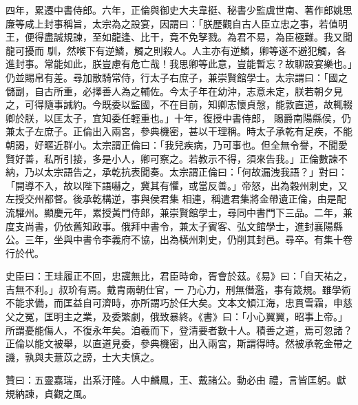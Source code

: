 \begin{pinyinscope}
 四年，累遷中書侍郎。六年，正倫與御史大夫韋挺、秘書少監虞世南、著作郎姚思廉等咸上封事稱旨，太宗為之設宴，因謂曰：「朕歷觀自古人臣立忠之事，若值明王，便得盡誠規諫，至如龍逢、比干，竟不免孥戮。為君不易，為臣極難。我又聞龍可擾而
 馴，然喉下有逆鱗，觸之則殺人。人主亦有逆鱗，卿等遂不避犯觸，各進封事。常能如此，朕豈慮有危亡哉！我思卿等此意，豈能暫忘？故聊設宴樂也。」仍並賜帛有差。尋加散騎常侍，行太子右庶子，兼崇賢館學士。太宗謂曰：「國之儲副，自古所重，必擇善人為之輔佐。今太子年在幼沖，志意未定，朕若朝夕見之，可得隨事誡約。今既委以監國，不在目前，知卿志懷貞愨，能敦直道，故輒輟卿於朕，以匡太子，宜知委任輕重也。」十年，復授中書侍郎，
 賜爵南陽縣侯，仍兼太子左庶子。正倫出入兩宮，參典機密，甚以干理稱。時太子承乾有足疾，不能朝謁，好暱近群小。太宗謂正倫曰：「我兒疾病，乃可事也。但全無令譽，不聞愛賢好善，私所引接，多是小人，卿可察之。若教示不得，須來告我。」正倫數諫不納，乃以太宗語告之，承乾抗表聞奏。太宗謂正倫曰：「何故漏洩我語？」對曰：「開導不入，故以陛下語嚇之，冀其有懼，或當反善。」帝怒，出為穀州刺史，又左授交州都督。後承乾構逆，事與侯君集
 相連，稱遣君集將金帶遺正倫，由是配流驩州。顯慶元年，累授黃門侍郎，兼崇賢館學士，尋同中書門下三品。二年，兼度支尚書，仍依舊知政事。俄拜中書令，兼太子賓客、弘文館學士，進封襄陽縣公。三年，坐與中書令李義府不協，出為橫州刺史，仍削其封邑。尋卒。有集十卷行於代。



 史臣曰：王珪履正不回，忠讜無比，君臣時命，胥會於茲。《易》曰：「自天祐之，吉無不利。」叔玠有焉。戴胄兩朝仕官，一
 乃心力，刑無僭濫，事有箴規。雖學術不能求備，而匡益自可濟時，亦所謂巧於任大矣。文本文傾江海，忠貫雪霜，申慈父之冤，匡明主之業，及委繁劇，俄致暴終。《書》曰：「小心翼翼，昭事上帝。」所謂憂能傷人，不復永年矣。洎羲而下，登清要者數十人。積善之道，焉可忽諸？正倫以能文被舉，以直道見委，參典機密，出入兩宮，斯謂得時。然被承乾金帶之譏，孰與夫薏苡之謗，士大夫慎之。



 贊曰：五靈嘉瑞，出系汙隆。人中麟鳳，王、戴諸公。動必由
 禮，言皆匡躬。獻規納諫，貞觀之風。



\end{pinyinscope}
